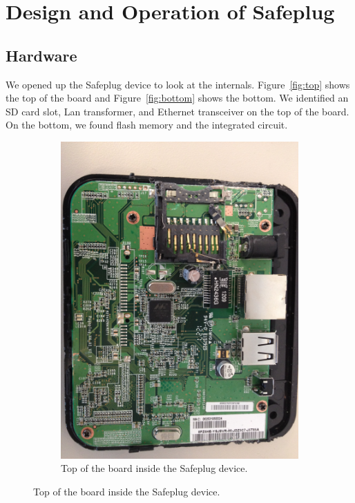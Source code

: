 \section{Design and Operation of Safeplug}
\label{sec:design}

\subsection{Hardware}
We opened up the Safeplug device to look at the internals.  Figure~\ref{fig:top} shows the top of the board and Figure~\ref{fig:bottom} shows the bottom.  We identified an SD card slot, Lan transformer, and Ethernet transceiver on the top of the board.  On the bottom, we found flash memory and the integrated circuit.

\begin{figure}[htb]
\centering
\begin{subfigure}[b]{.3\textwidth}
  \includegraphics[width=\textwidth]{safeplug_top}
  \caption{Top of the board inside the Safeplug device.}

\end{subfigure}
\end{figure}
